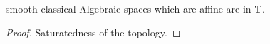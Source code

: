 \documentclass{article}
\begin{document}
\begin{lemma}
	smooth classical Algebraic spaces which are affine are in $\mathbb{T}$.
\end{lemma}
\begin{proof}
	Saturatedness of the topology.
\end{proof}

        
    
        
        
    
\end{document}
